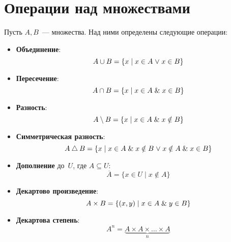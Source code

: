 \section{Операции над множествами}
Пусть $A, B$~--- множества. Над ними определены следующие операции:
\begin{itemize}
	\item\textbf{Объединение}:
	\begin{equation*}
	A \cup B = \{ x \mid x \in A \mathrel{\lor} x \in B \}
	\end{equation*}
	
	\item\textbf{Пересечение}:
	\begin{equation*}
	A \cap B = \{ x \mid x \in A \mathrel{\&} x \in B \}
	\end{equation*}
	
	\item\textbf{Разность}:
	\begin{equation*}
	A \setminus B = \{ x \mid x \in A \mathrel{\&} x \notin B \}
	\end{equation*}
	
	\item\textbf{Симметрическая разность}:
	\begin{equation*}
	A \bigtriangleup B = \{ x \mid x \in A \mathrel{\&} x \notin B \mathrel{\lor} x \notin A \mathrel{\&} x \in B \}
	\end{equation*}
	
	\item\textbf{Дополнение} до~$U$, где $A \subseteq U$:
	\begin{equation*}
	\overline A = \{ x \in U \mid x \notin A \}
	\end{equation*}
	
	\item\textbf{Декартово произведение}:
	\begin{equation*}
	A \times B = \{ (x, y) \mid x \in A \mathrel{\&} y \in B \}
	\end{equation*}
	
	\item\textbf{Декартова степень}:
	\begin{equation*}
	A^n = \underbrace{A \times A \times \ldots \times A}_n
	\end{equation*}
\end{itemize}